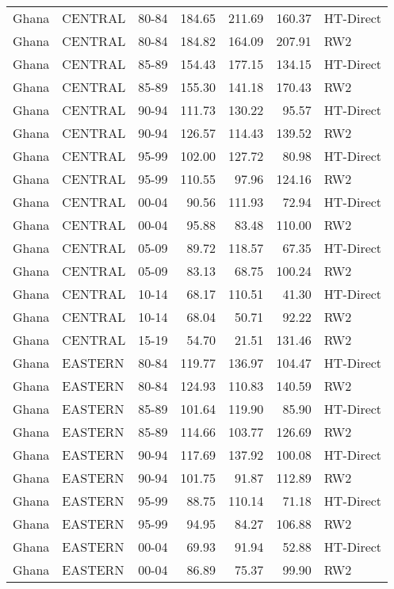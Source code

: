 \begin{longtable}{lllrrrl}
  Ghana & CENTRAL & 80-84 & 184.65 & 211.69 & 160.37 & HT-Direct \\ 
  Ghana & CENTRAL & 80-84 & 184.82 & 164.09 & 207.91 & RW2 \\ 
  Ghana & CENTRAL & 85-89 & 154.43 & 177.15 & 134.15 & HT-Direct \\ 
  Ghana & CENTRAL & 85-89 & 155.30 & 141.18 & 170.43 & RW2 \\ 
  Ghana & CENTRAL & 90-94 & 111.73 & 130.22 & 95.57 & HT-Direct \\ 
  Ghana & CENTRAL & 90-94 & 126.57 & 114.43 & 139.52 & RW2 \\ 
  Ghana & CENTRAL & 95-99 & 102.00 & 127.72 & 80.98 & HT-Direct \\ 
  Ghana & CENTRAL & 95-99 & 110.55 & 97.96 & 124.16 & RW2 \\ 
  Ghana & CENTRAL & 00-04 & 90.56 & 111.93 & 72.94 & HT-Direct \\ 
  Ghana & CENTRAL & 00-04 & 95.88 & 83.48 & 110.00 & RW2 \\ 
  Ghana & CENTRAL & 05-09 & 89.72 & 118.57 & 67.35 & HT-Direct \\ 
  Ghana & CENTRAL & 05-09 & 83.13 & 68.75 & 100.24 & RW2 \\ 
  Ghana & CENTRAL & 10-14 & 68.17 & 110.51 & 41.30 & HT-Direct \\ 
  Ghana & CENTRAL & 10-14 & 68.04 & 50.71 & 92.22 & RW2 \\ 
  Ghana & CENTRAL & 15-19 & 54.70 & 21.51 & 131.46 & RW2 \\ 
  Ghana & EASTERN & 80-84 & 119.77 & 136.97 & 104.47 & HT-Direct \\ 
  Ghana & EASTERN & 80-84 & 124.93 & 110.83 & 140.59 & RW2 \\ 
  Ghana & EASTERN & 85-89 & 101.64 & 119.90 & 85.90 & HT-Direct \\ 
  Ghana & EASTERN & 85-89 & 114.66 & 103.77 & 126.69 & RW2 \\ 
  Ghana & EASTERN & 90-94 & 117.69 & 137.92 & 100.08 & HT-Direct \\ 
  Ghana & EASTERN & 90-94 & 101.75 & 91.87 & 112.89 & RW2 \\ 
  Ghana & EASTERN & 95-99 & 88.75 & 110.14 & 71.18 & HT-Direct \\ 
  Ghana & EASTERN & 95-99 & 94.95 & 84.27 & 106.88 & RW2 \\ 
  Ghana & EASTERN & 00-04 & 69.93 & 91.94 & 52.88 & HT-Direct \\ 
  Ghana & EASTERN & 00-04 & 86.89 & 75.37 & 99.90 & RW2 \\ 

\end{longtable}
